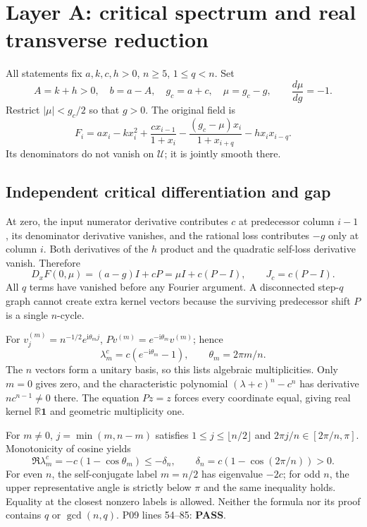 \documentclass[11pt]{article}
\newcommand{\one}{\mathbf{1}}
\newcommand{\R}{\mathbb R}
\newcommand{\U}{\mathcal U}
\newcommand{\lin}[1]{P09 lines #1}
\newcommand{\pass}{\textbf{PASS}}
\newcommand{\ii}{\mathrm i}
\begin{document}
\section{Layer A: critical spectrum and real transverse reduction}
\label{sec:reduction}
All statements fix $a,k,c,h>0$, $n\ge5$, $1\le q<n$. Set
\[
 A=k+h>0,\quad b=a-A,\quad g_c=a+c,\quad\mu=g_c-g,
 \qquad\frac{d\mu}{dg}=-1.
\]
Restrict $|\mu|<g_c/2$ so that $g>0$. The original field is
\begin{equation}
 F_i=a x_i-kx_i^2+\frac{c x_{i-1}}{1+x_i}
       -\frac{(g_c-\mu)x_i}{1+x_{i+q}}-h x_i x_{i-q}.
 \label{eq:original}
\end{equation}
Its denominators do not vanish on $\U$; it is jointly smooth there.

\subsection{Independent critical differentiation and gap}
At zero, the input numerator derivative contributes $c$ at predecessor
column $i-1$, its denominator derivative vanishes, and the rational loss
contributes $-g$ only at column $i$. Both derivatives of the $h$ product and
the quadratic self-loss derivative vanish. Therefore
\[
 D_xF(0,\mu)=(a-g)I+cP=\mu I+c(P-I),\qquad J_c=c(P-I).
\]
All $q$ terms have vanished before any Fourier argument. A disconnected
step-$q$ graph cannot create extra kernel vectors because the surviving
predecessor shift $P$ is a single $n$-cycle.

For $v^{(m)}_j=n^{-1/2}e^{\ii\theta_m j}$,
$Pv^{(m)}=e^{-\ii\theta_m}v^{(m)}$; hence
\[
 \lambda_m^c=c(e^{-\ii\theta_m}-1),\qquad\theta_m=2\pi m/n.
\]
The $n$ vectors form a unitary basis, so this lists algebraic multiplicities.
Only $m=0$ gives zero, and the characteristic polynomial
$(\lambda+c)^n-c^n$ has derivative $nc^{n-1}\ne0$ there. The equation $Pz=z$
forces every coordinate equal, giving real kernel $\R\one$ and geometric
multiplicity one.

For $m\ne0$, $j=\min(m,n-m)$ satisfies
$1\le j\le\lfloor n/2\rfloor$ and
$2\pi j/n\in[2\pi/n,\pi]$. Monotonicity of cosine yields
\[
 \Re\lambda_m^c=-c(1-\cos\theta_m)\le-\delta_n,
 \qquad\delta_n=c(1-\cos(2\pi/n))>0.
\]
For even $n$, the self-conjugate label $m=n/2$ has eigenvalue $-2c$;
for odd $n$, the upper representative angle is strictly below $\pi$ and
the same inequality holds. Equality at the closest nonzero labels is
allowed. Neither the formula nor its proof contains $q$ or $\gcd(n,q)$.
\lin{54--85}: \pass.
\end{document}
